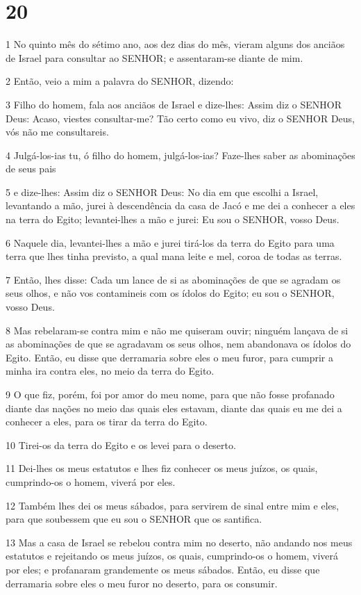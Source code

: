 \chapter{20}

\par 1 No quinto mês do sétimo ano, aos dez dias do mês, vieram alguns dos anciãos de Israel para consultar ao SENHOR; e assentaram-se diante de mim.
\par 2 Então, veio a mim a palavra do SENHOR, dizendo:
\par 3 Filho do homem, fala aos anciãos de Israel e dize-lhes: Assim diz o SENHOR Deus: Acaso, viestes consultar-me? Tão certo como eu vivo, diz o SENHOR Deus, vós não me consultareis.
\par 4 Julgá-los-ias tu, ó filho do homem, julgá-los-ias? Faze-lhes saber as abominações de seus pais
\par 5 e dize-lhes: Assim diz o SENHOR Deus: No dia em que escolhi a Israel, levantando a mão, jurei à descendência da casa de Jacó e me dei a conhecer a eles na terra do Egito; levantei-lhes a mão e jurei: Eu sou o SENHOR, vosso Deus.
\par 6 Naquele dia, levantei-lhes a mão e jurei tirá-los da terra do Egito para uma terra que lhes tinha previsto, a qual mana leite e mel, coroa de todas as terras.
\par 7 Então, lhes disse: Cada um lance de si as abominações de que se agradam os seus olhos, e não vos contamineis com os ídolos do Egito; eu sou o SENHOR, vosso Deus.
\par 8 Mas rebelaram-se contra mim e não me quiseram ouvir; ninguém lançava de si as abominações de que se agradavam os seus olhos, nem abandonava os ídolos do Egito. Então, eu disse que derramaria sobre eles o meu furor, para cumprir a minha ira contra eles, no meio da terra do Egito.
\par 9 O que fiz, porém, foi por amor do meu nome, para que não fosse profanado diante das nações no meio das quais eles estavam, diante das quais eu me dei a conhecer a eles, para os tirar da terra do Egito.
\par 10 Tirei-os da terra do Egito e os levei para o deserto.
\par 11 Dei-lhes os meus estatutos e lhes fiz conhecer os meus juízos, os quais, cumprindo-os o homem, viverá por eles.
\par 12 Também lhes dei os meus sábados, para servirem de sinal entre mim e eles, para que soubessem que eu sou o SENHOR que os santifica.
\par 13 Mas a casa de Israel se rebelou contra mim no deserto, não andando nos meus estatutos e rejeitando os meus juízos, os quais, cumprindo-os o homem, viverá por eles; e profanaram grandemente os meus sábados. Então, eu disse que derramaria sobre eles o meu furor no deserto, para os consumir.
